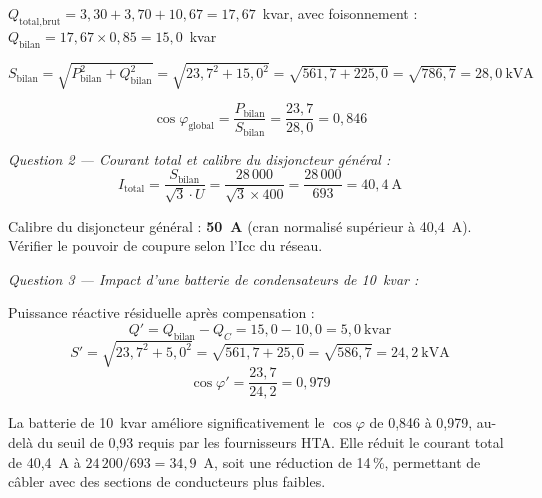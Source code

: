 $Q_{\text{total,brut}} = 3{,}30 + 3{,}70 + 10{,}67 = 17{,}67$~kvar, avec foisonnement : $Q_{\text{bilan}} = 17{,}67 \times 0{,}85 = 15{,}0$~kvar

\[
  S_{\text{bilan}} = \sqrt{P_{\text{bilan}}^2 + Q_{\text{bilan}}^2} = \sqrt{23{,}7^2 + 15{,}0^2} = \sqrt{561{,}7 + 225{,}0} = \sqrt{786{,}7} = \boxed{28{,}0~\text{kVA}}
\]

\[
  \cos\varphi_{\text{global}} = \frac{P_{\text{bilan}}}{S_{\text{bilan}}} = \frac{23{,}7}{28{,}0} = 0{,}846
\]

\textit{Question 2 — Courant total et calibre du disjoncteur général :}
\[
  I_{\text{total}} = \frac{S_{\text{bilan}}}{\sqrt{3} \cdot U} = \frac{28\,000}{\sqrt{3} \times 400} = \frac{28\,000}{693} = \boxed{40{,}4~\text{A}}
\]

Calibre du disjoncteur général : \textbf{50~A} (cran normalisé supérieur à 40,4~A). Vérifier le pouvoir de coupure selon l'Icc du réseau.

\textit{Question 3 — Impact d'une batterie de condensateurs de 10~kvar :}

Puissance réactive résiduelle après compensation :
\[
  Q' = Q_{\text{bilan}} - Q_C = 15{,}0 - 10{,}0 = 5{,}0~\text{kvar}
\]
\[
  S' = \sqrt{23{,}7^2 + 5{,}0^2} = \sqrt{561{,}7 + 25{,}0} = \sqrt{586{,}7} = 24{,}2~\text{kVA}
\]
\[
  \cos\varphi' = \frac{23{,}7}{24{,}2} = \boxed{0{,}979}
\]

\begin{methode}
La batterie de 10~kvar améliore significativement le $\cos\varphi$ de 0,846 à 0,979, au-delà du seuil de 0,93 requis par les fournisseurs HTA. Elle réduit le courant total de 40,4~A à $24\,200/693 = 34{,}9$~A, soit une réduction de 14\,\%, permettant de câbler avec des sections de conducteurs plus faibles.
\end{methode}
